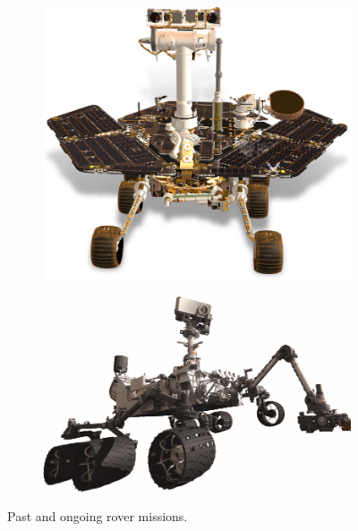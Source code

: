 \begin{figure}[h]
\begin{subfigure}[t]{\subfigureWidth}
		\includegraphics[height=\graphicsHeight]{sections/state-of-the-art/past-missions/images/rover-mer.png}
		\label{fig:sub:past-mission-rovers-mer}
	\end{subfigure}\hspace*{0.5cm}
    \begin{subfigure}[t]{\subfigureWidth}
        \centering
		\includegraphics[height=\graphicsHeight]{sections/state-of-the-art/past-missions/images/rover-msl.png}
		\label{fig:sub:past-mission-rovers-msl}
	\end{subfigure}
    \caption[Past and ongoing rover missions]
            {Past and ongoing rover missions.}
	\label{fig:past-mission-rovers}
\vspace{-2ex}
\end{figure}

